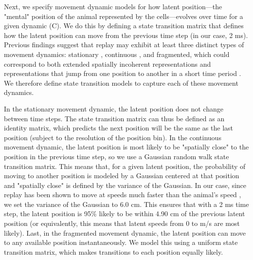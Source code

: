 \documentclass[9pt,lineno]{elife}
\begin{document}
Next, we specify movement dynamic models for how latent position---the "mental" position of the animal represented by the cells---evolves over time for a given dynamic (C). We do this by defining a state transition matrix that defines how the latent position can move from the previous time step (in our case, 2 ms). Previous findings suggest that replay may exhibit at least three distinct types of movement dynamics: stationary \citep{YuDistincthippocampalcorticalmemory2017, FarooqEmergencepreconfiguredplastic2019}, continuous \citep{DavidsonHippocampalReplayExtended2009}, and fragmented, which could correspond to both extended spatially incoherent representations and representations that jump from one position to another in a short time period \citep{PfeifferAutoassociativedynamicsgeneration2015}. We therefore define state transition models to capture each of these movement dynamics.

In the stationary movement dynamic, the latent position does not change between time steps. The state transition matrix can thus be defined as an identity matrix, which predicts the next position will be the same as the last position (subject to the resolution of the position bin). In the continuous movement dynamic, the latent position is most likely to be "spatially close" to the position in the previous time step, so we use a Gaussian random walk state transition matrix. This means that, for a given latent position, the probability of moving to another position is modeled by a Gaussian centered at that position and "spatially close" is defined by the variance of the Gaussian. In our case, since replay has been shown to move at speeds much faster than the animal's speed \citep{DavidsonHippocampalReplayExtended2009, PfeifferAutoassociativedynamicsgeneration2015}, we set the variance of the Gaussian to 6.0 cm. This ensures that with a 2 ms time step, the latent position is 95\% likely to be within 4.90 cm of the previous latent position (or equivalently, this means that latent speeds from 0 to  m/s are most likely). Last, in the fragmented movement dynamic, the latent position can move to any available position instantaneously. We model this using a uniform state transition matrix, which makes transitions to each position equally likely.
\end{document}
